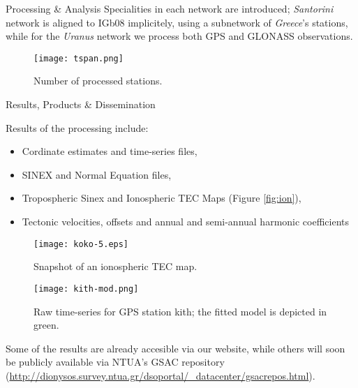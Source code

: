 \documentclass[final,a0,portrait]{beamer}
\newlength{\onecolwid}
\begin{document}
\begin{frame}[t]
\begin{columns}[t]
\begin{column}{\onecolwid}
\begin{block}{Processing \& Analysis}
{Specialities in each network are introduced; \emph{Santorini} network is aligned to IGb08 implicitely, using a subnetwork of 
\emph{Greece}'s stations, while for the \emph{Uranus} network we process both GPS and GLONASS observations.
}
\begin{figure}
  \centering
  \texttt{[image: tspan.png]}
  \caption{Number of processed stations.}
  \label{fig:tspan}
\end{figure}
\end{block}


\begin{block}{Results, Products \& Dissemination}
{\small
Results of the processing include:\\
\begin{itemize}
\item Cordinate estimates and time-series files,
\item SINEX and Normal Equation files,
\item Tropospheric Sinex and Ionospheric TEC Maps (Figure \ref{fig:ion}),
\item Tectonic velocities, offsets and annual and semi-annual harmonic coefficients
\end{itemize}

\begin{figure}
\centering
\begin{minipage}{.5\textwidth}
    \centering
    \texttt{[image: koko-5.eps]}
    \caption{Snapshot of an ionospheric TEC map.} %
    \label{fig:ion}
\end{minipage}%
\begin{minipage}{.5\textwidth}
    \centering
    \texttt{[image: kith-mod.png]}
    \caption{Raw time-series for GPS station kith; the fitted model is depicted in green.}
    \label{fig:modts}
\end{minipage}
\end{figure}

Some of the results are already accesible via our website, while others will soon be publicly available via NTUA's GSAC 
\cite{gsac} repository (\url{http://dionysos.survey.ntua.gr/dsoportal/_datacenter/gsacrepos.html}).\\

}
\end{block}
\end{column}
\end{columns}
\end{frame}
\end{document}
